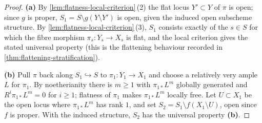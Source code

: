 \begin{proof}
  \textbf{(a)} By \cref{lem:flatness-local-criterion}\,(2) the flat locus
  $Y'\subset Y$ of $\pi$ is open; since $g$ is proper, $S_1 = S\setminus g(Y\setminus Y')$
  is open, given the induced open subscheme structure. By
  \cref{lem:flatness-local-criterion}\,(3), $S_1$ consists exactly of the $s\in S$
  for which the fibre morphism $\pi_s\colon Y_s\to X_s$ is flat, and the local
  criterion gives the stated universal property (this is the flattening behaviour
  recorded in \cref{thm:flattening-stratification}).

  \textbf{(b)} Pull $\pi$ back along $S_1\hookrightarrow S$ to
  $\pi_1\colon Y_1\to X_1$ and choose a relatively very ample $L$ for $\pi_1$. By
  noetherianity there is $m\ge 1$ with $\pi_{1*}L^m$ globally generated and
  $R^i\pi_{1*}L^m = 0$ for $i\ge 1$; flatness of $\pi_1$ makes $\pi_{1*}L^m$
  locally free. Let $U\subset X_1$ be the open locus where $\pi_{1*}L^m$ has rank
  $1$, and set $S_2 = S_1\setminus f(X_1\setminus U)$, open since $f$ is proper.
  With the induced structure, $S_2$ has the universal property \textbf{(b)}.
\end{proof}

